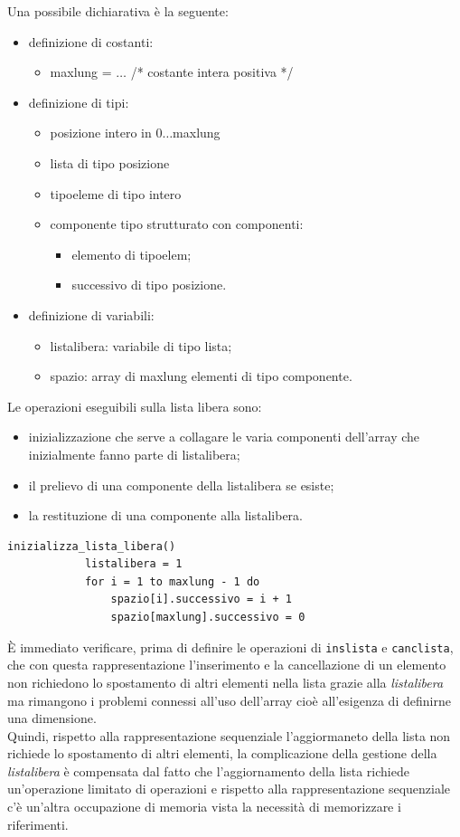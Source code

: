 \documentclass[12pt]{report}
\begin{document}
	Una possibile dichiarativa è la seguente:
	\begin{itemize}
		\item definizione di costanti:
		\begin{itemize}
			\item maxlung = $\dots$ /* costante intera positiva */
		\end{itemize}
		\item definizione di tipi:
		\begin{itemize}
			\item posizione intero in $0\dots$maxlung
			\item lista di tipo posizione
			\item tipoeleme di tipo intero
			\item componente tipo strutturato con componenti:
			\begin{itemize}
				\item elemento di tipoelem;
				\item successivo di tipo posizione.
			\end{itemize}
		\end{itemize}
		\item definizione di variabili:
		\begin{itemize}
			\item listalibera: variabile di tipo lista;
			\item spazio: array di maxlung elementi di tipo componente.
		\end{itemize}
	\end{itemize}

	Le operazioni eseguibili sulla lista libera sono:
	\begin{itemize}
		\item inizializzazione che serve a collagare le varia componenti dell'array che inizialmente fanno parte di listalibera;
		\item il prelievo di una componente della listalibera se esiste;
		\item la restituzione di una componente alla listalibera.
	\end{itemize}
	\begin{lstlisting}[style=normalstyle]
		inizializza_lista_libera()
			listalibera = 1
			for i = 1 to maxlung - 1 do
				spazio[i].successivo = i + 1
				spazio[maxlung].successivo = 0
\end{lstlisting}
	È immediato verificare, prima di definire le operazioni di \texttt{inslista} e \texttt{canclista}, che con questa rappresentazione l'inserimento e la cancellazione di un elemento non richiedono lo spostamento di altri elementi nella lista grazie alla \textit{listalibera} ma rimangono i problemi connessi all'uso dell'array cioè all'esigenza di definirne una dimensione. \\
	Quindi, rispetto alla rappresentazione sequenziale l'aggiormaneto della lista non richiede lo spostamento di altri elementi, la complicazione della gestione della \textit{listalibera} è compensata dal fatto che l'aggiornamento della lista richiede un'operazione limitato di operazioni e rispetto alla rappresentazione sequenziale c'è un'altra occupazione di memoria vista la necessità di memorizzare i riferimenti.
\end{document}
